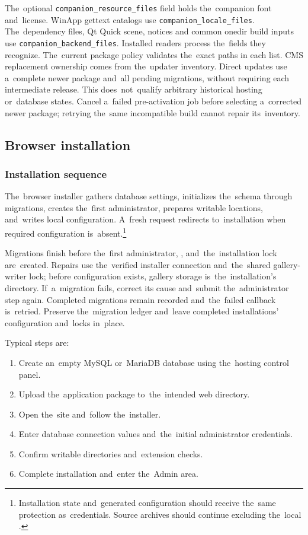 \documentclass[11pt,a4paper]{article}
\newcommand{\filepath}[1]{\path{#1}}
\newcommand{\codeword}[1]{\nolinkurl{#1}}
\begin{document}
The~optional \codeword{companion_resource_files} field holds the~companion font
and~license. WinApp gettext catalogs use \codeword{companion_locale_files}.
The~dependency files, Qt Quick scene, notices and common onedir build inputs
use \codeword{companion_backend_files}.
Installed readers process the~fields they recognize. The~current package
policy validates the~exact paths in each list. CMS replacement ownership comes
from the~updater inventory. Direct updates use a~complete
newer package and~all pending migrations, without requiring each intermediate
release. This does~not~qualify arbitrary historical hosting or~database states.
Cancel a~failed pre-activation job before selecting a~corrected newer package;
retrying the~same incompatible build cannot repair its~inventory.

\subsection{Browser installation}

\subsubsection{Installation sequence}

The~browser installer gathers database settings, initializes the~schema through
migrations, creates the~first administrator, prepares writable locations,
and~writes local configuration. A~fresh request redirects to~installation when
required configuration is~absent.\footnote{Installation state and~generated
configuration should receive the~same protection as~credentials. Source archives
should continue excluding the~local \filepath{config.php}.}

Migrations finish before the~first administrator, \filepath{config.php},
and~the~installation lock are~created. Repairs use the~verified installer
connection and~the~shared gallery-writer lock; before configuration exists,
gallery storage is~the~installation's \filepath{galleries/} directory.
If~a~migration fails, correct its cause and~submit the~administrator step again.
Completed migrations remain recorded and~the~failed callback is~retried.
Preserve the~migration ledger and~leave completed installations' configuration
and~locks in~place.

Typical steps are:

\begin{enumerate}
  \item Create an~empty MySQL or~MariaDB database using the~hosting control
  panel.
  \item Upload the~application package to~the~intended web directory.
  \item Open the~site and~follow the~installer.
  \item Enter database connection values and~the~initial administrator
  credentials.
  \item Confirm writable directories and~extension checks.
  \item Complete installation and~enter the~Admin area.
\end{enumerate}
\end{document}
